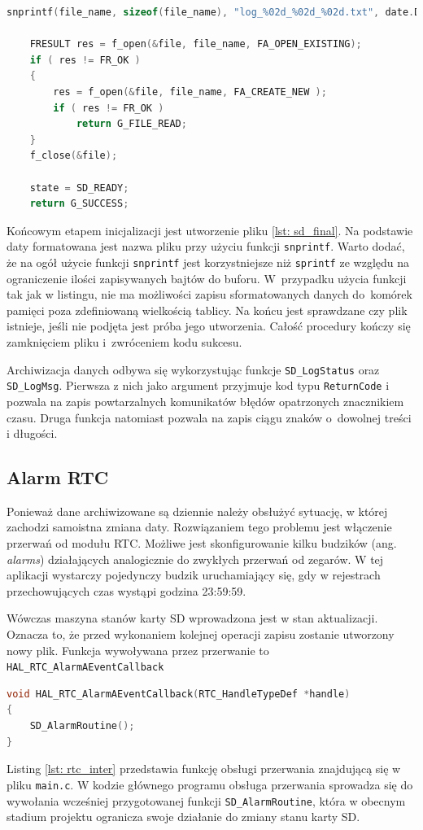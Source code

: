 \begin{lstlisting}[language=C,
    caption={Utworzenie plików do archiwizacji danych},
    label={lst: sd_final}]
    snprintf(file_name, sizeof(file_name), "log_%02d_%02d_%02d.txt", date.Date, date.Month, date.Year);

    FRESULT res = f_open(&file, file_name, FA_OPEN_EXISTING);
    if ( res != FR_OK )
    {
    	res = f_open(&file, file_name, FA_CREATE_NEW );
    	if ( res != FR_OK )
    		return G_FILE_READ;
    }
    f_close(&file);

    state = SD_READY;
    return G_SUCCESS;
\end{lstlisting}
Końcowym etapem inicjalizacji jest utworzenie pliku \ref{lst: sd_final}. Na podstawie daty formatowana jest nazwa pliku przy użyciu funkcji \texttt{snprintf}.  Warto dodać, że na ogół użycie funkcji \texttt{snprintf} jest korzystniejsze niż \texttt{sprintf} ze względu na ograniczenie ilości zapisywanych bajtów do buforu. W~przypadku użycia funkcji tak jak w listingu, nie ma możliwości zapisu sformatowanych danych do~komórek pamięci poza zdefiniowaną wielkością tablicy. Na końcu jest sprawdzane czy plik istnieje, jeśli nie podjęta jest próba jego utworzenia. Całość procedury kończy się zamknięciem pliku i~zwróceniem kodu sukcesu. 

Archiwizacja danych odbywa się wykorzystując funkcje \texttt{SD\_LogStatus} oraz \texttt{SD\_LogMsg}. Pierwsza z nich jako argument przyjmuje kod typu \texttt{ReturnCode} i pozwala na zapis powtarzalnych komunikatów błędów opatrzonych znacznikiem czasu. Druga funkcja natomiast pozwala na zapis ciągu znaków o~dowolnej treści i długości.

\subsection{Alarm RTC}
Ponieważ dane archiwizowane są dziennie należy obsłużyć sytuację, w której zachodzi samoistna zmiana daty. Rozwiązaniem tego problemu jest włączenie przerwań od modułu RTC. Możliwe jest skonfigurowanie kilku budzików (ang. \textit{alarms}) działających analogicznie do zwykłych przerwań od zegarów. W tej aplikacji wystarczy pojedynczy budzik uruchamiający się, gdy w rejestrach przechowujących czas wystąpi godzina 23:59:59. 

Wówczas maszyna stanów karty SD wprowadzona jest w stan aktualizacji. Oznacza to, że przed wykonaniem kolejnej operacji zapisu zostanie utworzony nowy plik. Funkcja wywoływana przez przerwanie to \texttt{HAL\_RTC\_AlarmAEventCallback}
\begin{lstlisting}[language=C,
caption={Przerwanie od alarmu RTC},
label={lst: rtc_inter}]
void HAL_RTC_AlarmAEventCallback(RTC_HandleTypeDef *handle)
{
	SD_AlarmRoutine();
}
\end{lstlisting}
Listing \ref{lst: rtc_inter} przedstawia funkcję obsługi przerwania znajdującą się w pliku \texttt{main.c}. W kodzie głównego programu obsługa przerwania sprowadza się do wywołania wcześniej przygotowanej funkcji \texttt{SD\_AlarmRoutine}, która w obecnym stadium projektu ogranicza swoje działanie do zmiany stanu karty SD.

